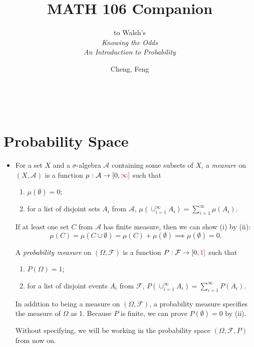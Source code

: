 \documentclass[11pt]{article}
\title{MATH 106 Companion}
\author{Cheng, Feng}
\subtitle{to Walsh's \\ \textit{Knowing the Odds \\ An Introduction to Probability}}
\makeatletter
\newcommand{\df}[1]{\textit{\textsf{#1}}} %
\newcommand{\F}{\mathcal{F}} %
\newcommand{\A}{\mathcal{A}}
\newcommand{\tpurp}[1]{\textcolor{purple}{#1}}
\let\@subtitle\@empty %
\newcommand{\makemytitle}{
    \begin{center}
        {\Large \@title}
        \@subtitle
        \vspace{0.5em}
        \\ \@author
        \vspace{-0.5em}
    \end{center}
}
\makeatother
\begin{document}
\makemytitle

\section{Probability Space}
\begin{itemize}
    \item For a set $X$ and a $\sigma$-algebra $\A$ containing some subsets of $X$, a \df{measure} on $(X,\A)$ is a function $\mu: \A \to [0, \tpurp{\infty]}$ such that 
    \begin{enumerate}[label=(\roman*)]
        \item $\mu(\emptyset)=0$;
        \item for a list of disjoint sets $A_i$ from $\A$, $\mu(\cup_{i=1}^\infty A_i) = \sum_{i=1}^\infty \mu(A_i)$.
    \end{enumerate}
    If at least one set $C$ from $\A$ has finite measure, then we can show (i) by (ii): \[\mu(C) = \mu(C \cup \emptyset) = \mu(C) + \mu(\emptyset) \implies \mu(\emptyset) = 0.\]
    
    A \df{probability measure} on $(\Omega, \F)$ is a function $P: \F \to [0,\tpurp{1]}$ such that 
    \begin{enumerate}[label=(\roman*)]
        \item $P(\Omega) = 1$;
        \item for a list of disjoint events $A_i$ from $\F$, $P(\cup_{i=1}^\infty A_i) = \sum_{i=1}^\infty P(A_i)$.
    \end{enumerate}
    In addition to being a measure on $(\Omega, \F)$, a probability measure specifies the measure of $\Omega$ as 1. Because $P$ is finite, we can prove $P(\emptyset) = 0$ by (ii).
    
    Without specifying, we will be working in the probability space $(\Omega, \F, P)$ from now on.
\end{itemize}
\end{document}
